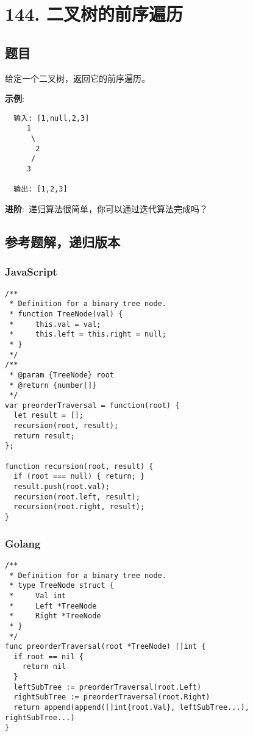\newpage
\section{144. 二叉树的前序遍历}
\label{leetcode:144}

\subsection{题目}

给定一个二叉树，返回它的前序遍历。

\textbf{示例}:

\begin{verbatim}
  输入: [1,null,2,3]
     1
      \
       2
      /
     3

  输出: [1,2,3]
\end{verbatim}

\textbf{进阶}: 递归算法很简单，你可以通过迭代算法完成吗？

\subsection{参考题解，递归版本}

\subsubsection{JavaScript}

\begin{verbatim}
/**
 * Definition for a binary tree node.
 * function TreeNode(val) {
 *     this.val = val;
 *     this.left = this.right = null;
 * }
 */
/**
 * @param {TreeNode} root
 * @return {number[]}
 */
var preorderTraversal = function(root) {
  let result = [];
  recursion(root, result);
  return result;
};

function recursion(root, result) {
  if (root === null) { return; }
  result.push(root.val);
  recursion(root.left, result);
  recursion(root.right, result);
}
\end{verbatim}

\subsubsection{Golang}

\begin{verbatim}
/**
 * Definition for a binary tree node.
 * type TreeNode struct {
 *     Val int
 *     Left *TreeNode
 *     Right *TreeNode
 * }
 */
func preorderTraversal(root *TreeNode) []int {
  if root == nil {
    return nil
  }
  leftSubTree := preorderTraversal(root.Left)
  rightSubTree := preorderTraversal(root.Right)
  return append(append([]int{root.Val}, leftSubTree...), rightSubTree...)
}
\end{verbatim}
